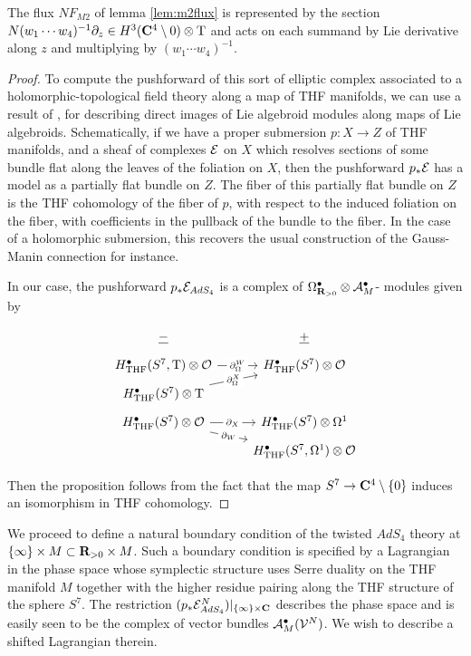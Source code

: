 \documentclass[../main.tex]{subfiles}
\begin{document}
The flux $NF_{M2}$ of lemma \ref{lem:m2flux} is represented by the section $N (w_1\cdots w_4)^{-1}\partial_z \in H^3 (\mathbf{C}^4\setminus 0)\otimes {\mathrm{T}}$ and acts on each summand by Lie derivative along $z$ and multiplying by $(w_1\cdots w_4)^{-1}$.

\begin{proof}
To compute the pushforward of this sort of elliptic complex associated to a holomorphic-topological field theory along a map of THF manifolds, we can use a result of \cite[section 4.2]{KormanThesis}, \cite{KamberTondeur} for describing direct images of Lie algebroid modules along maps of Lie algebroids. Schematically, if we have a proper submersion $p : X\to Z$ of THF manifolds, and a sheaf of complexes $\mathcal{E}$ on $X$ which resolves sections of some bundle flat along the leaves of the foliation on $X$, then the pushforward $p_*\mathcal{E}$ has a model as a partially flat bundle on $Z$. The fiber of this partially flat bundle on $Z$ is the THF cohomology of the fiber of $p$, with respect to the induced foliation on the fiber, with coefficients in the pullback of the bundle to the fiber. In the case of a holomorphic submersion, this recovers the usual construction of the Gauss-Manin connection for instance. 

In our case, the pushforward $p_* \mathcal{E}_{AdS_4}$ is a complex of $\Omega^\bullet_{\mathbf{R}_{>0}} \otimes \mathcal A^\bullet_M$- modules given by 

\begin{equation}
  \label{eqn:ads4ss} 
  \begin{tikzcd}[row sep = 1 ex]
    \ul{-} & \ul{+} \\ 
H^\bullet_{\mr{THF}}(S^7, \T) \otimes \mc{O}\ar[r, "\del^W_\Omega" description] & H^\bullet_{\mr{THF}} (S^7) \otimes \mc O \\
H^\bullet_{\mr{THF}} (S^7)  \otimes \T\ar[ur, "\del^X_\Omega" description] \\
H^\bullet_{\mr{THF}} (S^7)\otimes \mc{O}\ar[r, "\del_X" description]\ar[dr, "\del_W" description] & H^\bullet_{\mr{THF}} (S^7) \otimes \Omega^1
 \\ & H^\bullet_{\mr{THF}} (S^7, \Omega^1)  \otimes \mc O
 \end{tikzcd}
\end{equation}

Then the proposition follows from the fact that the map $S^7\to \mathbf{C}^4\setminus \{0\}$ induces an isomorphism in THF cohomology.
\end{proof}

\parsec{}
We proceed to define a natural boundary condition of the twisted $AdS_4$ theory at $\{\infty\} \times M \subset \mathbf{R}_{>0} \times M$. 
Such a boundary condition is specified by a Lagrangian in the phase space whose symplectic structure uses Serre duality on the THF manifold $M$ together with the higher residue pairing along the THF structure of the sphere $S^7$. 
The restriction $(p_* \mathcal{E}^N_{AdS_4})|_{\{\infty\}\times \mathbf{C}}$ describes the phase space and is easily seen to be the complex of vector bundles $\mathcal A_M^\bullet (\mathcal{V}^N)$. 
We wish to describe a shifted Lagrangian therein.
\end{document}
